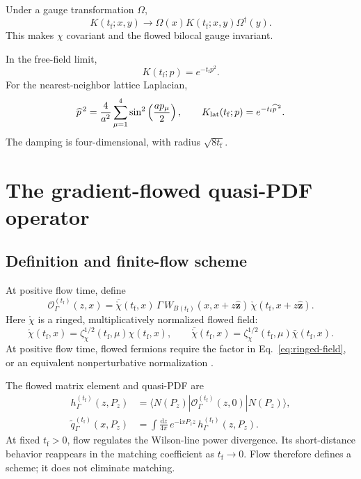 \documentclass[11pt]{article}
\numberwithin{equation}{section}
\newcommand{\dd}{\mathrm{d}}
\newcommand{\ii}{\mathrm{i}}
\newcommand{\cO}{\mathcal{O}}
\newcommand{\tf}{t_{\mathrm f}}
\newcommand{\qtilde}{\widetilde q}
\newcommand{\hflow}{h_{\Gamma}^{(\tf)}}
\begin{document}
Under a gauge transformation \(\Omega\),
\begin{equation}
  K(\tf;x,y)\longrightarrow
  \Omega(x)K(\tf;x,y)\Omega^\dagger(y).
\end{equation}
This makes \(\chi\) covariant and the flowed bilocal gauge invariant.

In the free-field limit,
\begin{equation}
  K(\tf;p)=e^{-\tf p^2}.
\end{equation}
For the nearest-neighbor lattice Laplacian,
\begin{equation}
  \widehat p^{\,2}
  =
  \frac{4}{a^2}\sum_{\mu=1}^4
  \sin^2\left(\frac{ap_\mu}{2}\right),
  \qquad
  K_{\rm lat}(\tf;p)=e^{-\tf\widehat p^{\,2}}.
  \label{eq:lattice-free-kernel}
\end{equation}
The damping is four-dimensional, with radius \(\sqrt{8\tf}\).

\section{The gradient-flowed quasi-PDF operator}

\subsection{Definition and finite-flow scheme}

At positive flow time, define
\begin{equation}
  \cO_\Gamma^{(\tf)}(z,x)
  =
  \overline{\mathring\chi}(\tf,x)\,
  \Gamma\,
  W_{B(\tf)}(x,x+z\hat{\bm z})\,
  \mathring\chi(\tf,x+z\hat{\bm z}).
  \label{eq:flowed-quasi-operator}
\end{equation}
Here \(\mathring\chi\) is a ringed, multiplicatively normalized flowed field:
\begin{equation}
  \mathring\chi(\tf,x)
  =
  \zeta_\chi^{1/2}(\tf,\mu)\chi(\tf,x),
  \qquad
  \overline{\mathring\chi}(\tf,x)
  =
  \zeta_\chi^{1/2}(\tf,\mu)\bar\chi(\tf,x).
  \label{eq:ringed-field}
\end{equation}
At positive flow time, flowed fermions require the factor in
Eq.~\eqref{eq:ringed-field}, or an equivalent nonperturbative normalization
\cite{Luscher2013,MakinoSuzuki2014}.

The flowed matrix element and quasi-PDF are
\begin{align}
  \hflow(z,P_z)
  &=
  \langle N(P_z)|\cO_\Gamma^{(\tf)}(z,0)|N(P_z)\rangle,
  \\
  \qtilde_\Gamma^{(\tf)}(x,P_z)
  &=
  \int\frac{\dd z}{4\pi}\,
  e^{-\ii xP_z z}\,
  \hflow(z,P_z).
  \label{eq:flowed-quasi-pdf}
\end{align}
At fixed \(\tf>0\), flow regulates the Wilson-line power divergence. Its
short-distance behavior reappears in the matching coefficient as
\(\tf\to0\). Flow therefore defines a scheme; it does not eliminate matching.
\end{document}
